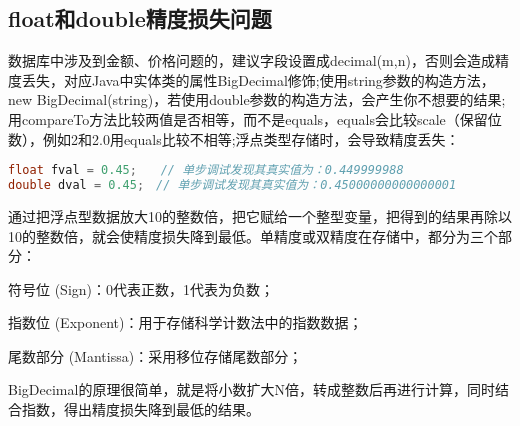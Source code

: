 \documentclass[../../../interview-questions.tex]{subfiles}
\begin{document}
\subsection{float和double精度损失问题}

数据库中涉及到金额、价格问题的，建议字段设置成decimal(m,n)，否则会造成精度丢失，对应Java中实体类的属性BigDecimal修饰;使用string参数的构造方法，new  BigDecimal(string)，若使用double参数的构造方法，会产生你不想要的结果;用compareTo方法比较两值是否相等，而不是equals，equals会比较scale（保留位数），例如2和2.0用equals比较不相等;浮点类型存储时，会导致精度丢失：

\begin{lstlisting}[language=Java]
float fval = 0.45;　　// 单步调试发现其真实值为：0.449999988
double dval = 0.45;　// 单步调试发现其真实值为：0.45000000000000001
\end{lstlisting}

通过把浮点型数据放大10的整数倍，把它赋给一个整型变量，把得到的结果再除以10的整数倍，就会使精度损失降到最低。单精度或双精度在存储中，都分为三个部分：

符号位 (Sign)：0代表正数，1代表为负数；

指数位 (Exponent)：用于存储科学计数法中的指数数据；

尾数部分 (Mantissa)：采用移位存储尾数部分；

BigDecimal的原理很简单，就是将小数扩大N倍，转成整数后再进行计算，同时结合指数，得出精度损失降到最低的结果。
\end{document}
